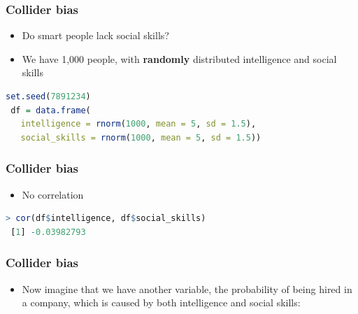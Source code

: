 %
%

\begin{frame}[fragile]
\frametitle{Collider bias}
\centering

\begin{itemize}
  \item Do smart people lack social skills?
  \item We have 1,000 people, with \textbf{randomly} distributed intelligence and social skills
\end{itemize}

 \begin{lstlisting}[language=R]
 set.seed(7891234)
 df = data.frame(
   intelligence = rnorm(1000, mean = 5, sd = 1.5),
   social_skills = rnorm(1000, mean = 5, sd = 1.5))
 \end{lstlisting}

\end{frame}
\note{}

\begin{frame}[fragile]
\frametitle{Collider bias}
\centering

\begin{itemize}
  \item No correlation
\end{itemize}

 \begin{lstlisting}[language=R]
 > cor(df$intelligence, df$social_skills)
 [1] -0.03982793
 \end{lstlisting}

\end{frame}
\note{}

\begin{frame}
\frametitle{Collider bias}
\centering

\begin{itemize}
  \item Now imagine that we have another variable, the probability of being hired in a company, which is caused by both intelligence and social skills:
\end{itemize}


\end{frame}
\note{}

